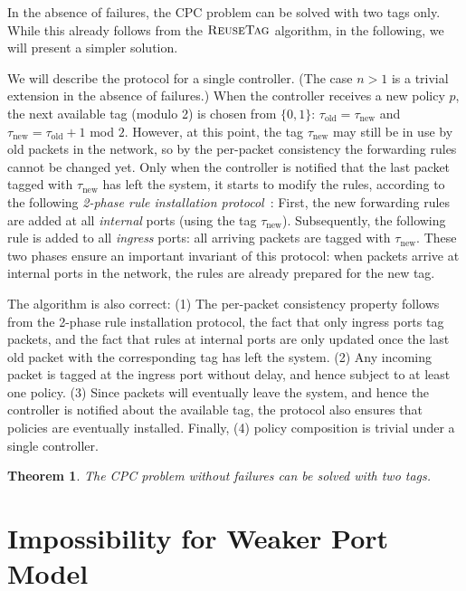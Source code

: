 \documentclass[11pt,pdftex,letter]{article}
\newcommand{\DPO}{\textsc{ReuseTag}}
\newtheorem{theorem}{Theorem}
\begin{document}
\begin{appendix}
{In the absence of failures, the CPC problem can be solved
with two tags only. While this already follows from the $\DPO$ algorithm,
in the following, we will present a simpler solution.

We will describe the protocol for a single controller. (The case $n>1$ is a trivial extension
in the absence of failures.)
When the controller
receives a new policy $p$, the next available tag (modulo 2) is chosen from $\{0,1\}$:
$\tau_{\text{old}}=\tau_{\text{new}}$ and $\tau_{\text{new}}=\tau_{\text{old}}+1$ mod $2$. However, at this point, the tag
$\tau_{\text{new}}$ may still be in use by old packets in the network, so by the per-packet consistency
the forwarding rules cannot be changed yet. Only when the controller
is notified that the last packet tagged with $\tau_{\text{new}}$ has left the system,
it starts to modify the rules, according to the following \emph{2-phase rule installation protocol}~\cite{network-update}:
First, the new forwarding rules are added at all \emph{internal} ports (using the tag $\tau_{\text{new}}$).
Subsequently, the following rule
is added to all \emph{ingress} ports: all arriving packets are tagged with $\tau_{\text{new}}$.
 These two phases ensure an important invariant of this protocol: when packets arrive at internal ports in the network,
 the rules are already prepared for the new tag.


The algorithm is also correct:
(1) The per-packet consistency property follows from the 2-phase rule installation
protocol, the fact that only ingress ports tag packets, and the fact that rules at internal ports are only
updated once the last old packet with the corresponding tag has left the
system. (2) Any incoming packet is tagged at the ingress port without delay,
and hence subject to at least one policy. (3) Since packets will eventually leave the system, and hence the controller is notified about the available tag,
  the protocol also ensures that policies are eventually installed. Finally, (4) policy composition is trivial
under a single controller.

\begin{theorem}\label{thm:onebit}
The CPC problem without failures can be solved with two tags.
\end{theorem}
}

\section{Impossibility for Weaker Port Model}\label{sec:weaker-port}


\end{appendix}
\end{document}
